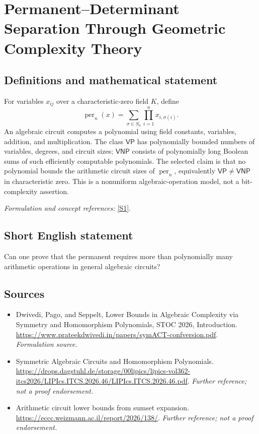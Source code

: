 \documentclass[11pt]{article}
\begin{document}
\section*{\texorpdfstring{Permanent–Determinant Separation Through Geometric Complexity Theory}{Permanent–Determinant Separation Through Geometric Complexity Theory}}\label{30001375}
\subsection{Definitions and mathematical statement}
For variables $x_{ij}$ over a characteristic-zero field $K$, define
\[
 \operatorname{per}_n(x)=\sum_{\sigma\in S_n}\prod_{i=1}^n x_{i,\sigma(i)}.
\]
An algebraic circuit computes a polynomial using field constants, variables, addition, and multiplication. The class $\mathsf{VP}$ has polynomially bounded numbers of variables, degrees, and circuit sizes; $\mathsf{VNP}$ consists of polynomially long Boolean sums of such efficiently computable polynomials. The selected claim is that no polynomial bounds the arithmetic circuit sizes of $\operatorname{per}_n$, equivalently $\mathsf{VP}\ne\mathsf{VNP}$ in characteristic zero. This is a nonuniform algebraic-operation model, not a bit-complexity assertion.
\par\smallskip\textit{Formulation and concept references:} \href{https://www.prateekdwivedi.in/papers/symACT-confversion.pdf}{[S1]}.

\subsection{Short English statement}
Can one prove that the permanent requires more than polynomially many arithmetic operations in general algebraic circuits?
\subsection{Sources}
\begin{itemize}
\item[S1]Dwivedi, Pago, and Seppelt, Lower Bounds in Algebraic Complexity via Symmetry and Homomorphism Polynomials, STOC 2026, Introduction.
\url{https://www.prateekdwivedi.in/papers/symACT-confversion.pdf}.
\textit{Formulation source.}
\item[S2]Symmetric Algebraic Circuits and Homomorphism Polynomials.
\url{https://drops.dagstuhl.de/storage/00lipics/lipics-vol362-itcs2026/LIPIcs.ITCS.2026.46/LIPIcs.ITCS.2026.46.pdf}.
\textit{Further reference; not a proof endorsement.}
\item[S3]Arithmetic circuit lower bounds from sumset expansion.
\url{https://eccc.weizmann.ac.il/report/2026/138/}.
\textit{Further reference; not a proof endorsement.}
\end{itemize}
\end{document}
